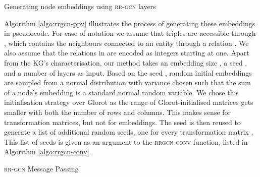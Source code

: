 \documentclass{llncs}
\begin{document}
\begin{algorithm}[h]
\DontPrintSemicolon
{}
  \caption{Generating node embeddings using \textsc{rr-gcn} layers}\label{algo:rrgcn-ppv}
\end{algorithm}
\setlength{\textfloatsep}{5pt}
Algorithm \ref{algo:rrgcn-ppv} illustrates the process of generating these embeddings in pseudocode. For ease of notation we assume that triples are accessible through , which contains the neighbours connected to an entity  through a relation . We also assume that the relations in  are encoded as integers starting at one. Apart from the KG's characterisation, our method takes an embedding size , a seed , and a number of layers  as input. Based on the seed , random initial embeddings are sampled from a normal distribution with variance chosen such that the sum of a node's embedding is a standard normal random variable. We chose this initialisation strategy over Glorot as the range of Glorot-initialised matrices gets smaller with both the number of rows and columns. This makes sense for transformation matrices, but not for embeddings.
The seed  is then reused to generate a list of additional random seeds, one for every transformation matrix . This list of seeds is given as an argument to the \textsc{rrgcn-conv} function, listed in Algorithm \ref{algo:rrgcn-conv}.

\begin{algorithm}[h]
\DontPrintSemicolon
{}
  \caption{\textsc{rr-gcn} Message Passing}
  \label{algo:rrgcn-conv}
\end{algorithm}
\setlength{\textfloatsep}{5pt}
\end{document}
